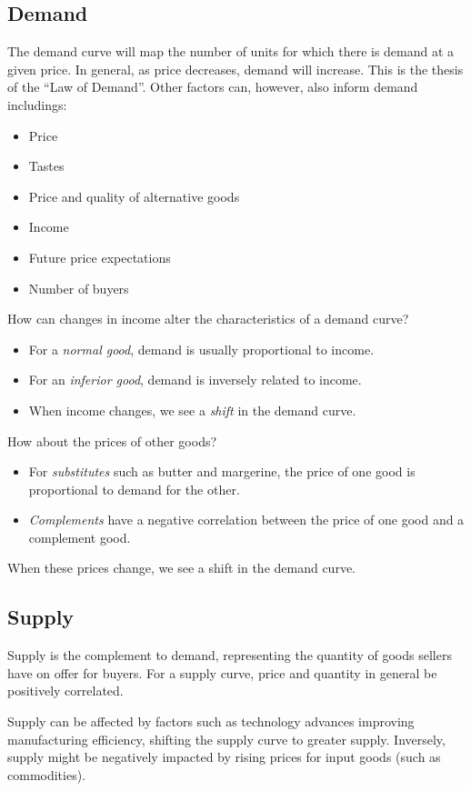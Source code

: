 \documentclass[12pt]{report}
\begin{document}
\begin{flushleft}
\subsection*{Demand}
The demand curve will map the number of units for which there is demand at a given price.
In general, as price decreases, demand will increase. This is the thesis of the ``Law of Demand''. 
Other factors can, however, also inform demand includings:
\begin{itemize}
    \item Price
    \item Tastes
    \item Price and quality of alternative goods
    \item Income
    \item Future price expectations
    \item Number of buyers
\end{itemize}
How can changes in income alter the characteristics of a demand curve?
\begin{itemize}
    \item For a \textit{normal good}, demand is usually proportional to income.
    \item For an \textit{inferior good}, demand is inversely related to income.
    \item When income changes, we see a \textit{shift} in the demand curve.
\end{itemize}
How about the prices of other goods?
\begin{itemize}
    \item For \textit{substitutes} such as butter and margerine, the price of one good is proportional to demand for the other.
    \item \textit{Complements} have a negative correlation between the price of one good and a complement good.
\end{itemize}
When these prices change, we see a shift in the demand curve.

\subsection*{Supply}
Supply is the complement to demand, representing the quantity of goods sellers have 
on offer for buyers. For a supply curve, price and quantity in general be positively correlated.

\bigskip
Supply can be affected by factors such as technology advances improving manufacturing
efficiency, shifting the supply curve to greater supply. Inversely, supply might be 
negatively impacted by rising prices for input goods (such as commodities).


\end{flushleft}
\end{document}

